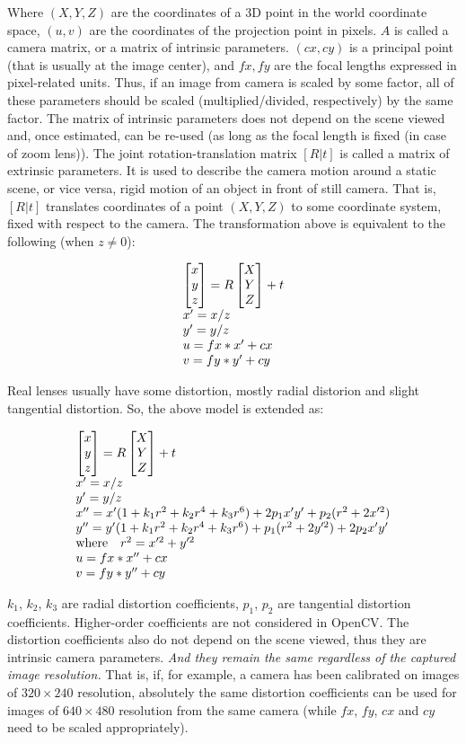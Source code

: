 Where $(X, Y, Z)$ are the coordinates of a 3D point in the world
coordinate space, $(u, v)$ are the coordinates of the projection point
in pixels. $A$ is called a camera matrix, or a matrix of
intrinsic parameters. $(cx, cy)$ is a principal point (that is
usually at the image center), and $fx, fy$ are the focal lengths
expressed in pixel-related units. Thus, if an image from camera is
scaled by some factor, all of these parameters should
be scaled (multiplied/divided, respectively) by the same factor. The
matrix of intrinsic parameters does not depend on the scene viewed and,
once estimated, can be re-used (as long as the focal length is fixed (in
case of zoom lens)). The joint rotation-translation matrix $[R|t]$
is called a matrix of extrinsic parameters. It is used to describe the
camera motion around a static scene, or vice versa, rigid motion of an
object in front of still camera. That is, $[R|t]$ translates
coordinates of a point $(X, Y, Z)$ to some coordinate system,
fixed with respect to the camera. The transformation above is equivalent
to the following (when $z \ne 0$):

\[
\begin{array}{l}
\begin{bmatrix} x\\ y\\ z \end{bmatrix} = R \begin{bmatrix} X\\ Y\\ Z \end{bmatrix} + t\\
x' = x/z\\
y' = y/z\\
u = fx*x' + cx\\
v = fy*y' + cy
\end{array}
\]

Real lenses usually have some distortion, mostly
radial distorion and slight tangential distortion. So, the above model
is extended as:

\[
\begin{array}{l}
\begin{bmatrix} x\\ y\\ z \end{bmatrix} = R \begin{bmatrix} X\\ Y\\ Z \end{bmatrix} + t\\
x' = x/z\\
y' = y/z\\
x'' = x' (1 + k_1 r^2 + k_2 r^4 + k_3 r^6) + 2 p_1 x' y' + p_2(r^2 + 2 x'^2) \\
y'' = y' (1 + k_1 r^2 + k_2 r^4 + k_3 r^6) + p_1 (r^2 + 2 y'^2) + 2 p_2 x' y' \\
\text{where} \quad r^2 = x'^2 + y'^2 \\
u = fx*x'' + cx\\
v = fy*y'' + cy
\end{array}
\]

$k_1$, $k_2$, $k_3$ are radial distortion coefficients, $p_1$, $p_2$ are tangential distortion coefficients.
Higher-order coefficients are not considered in OpenCV.
The distortion coefficients also do not depend on the scene viewed, thus they are intrinsic camera parameters.
\emph{And they remain the same regardless of the captured image resolution.}
That is, if, for example, a camera has been calibrated on images of $320
\times 240$ resolution, absolutely the same distortion coefficients can
be used for images of $640 \times 480$ resolution from the same camera (while $fx$,
$fy$, $cx$ and $cy$ need to be scaled appropriately).

